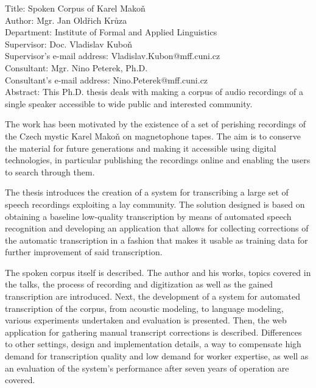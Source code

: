\noindent
Title: Spoken Corpus of Karel Makoň\\
Author: Mgr. Jan Oldřich Krůza\\
Department: Institute of Formal and Applied Linguistics\\
Supervisor: Doc. Vladislav Kuboň\\
Supervisor's e-mail address: Vladislav.Kubon@mff.cuni.cz\\
Consultant: Mgr. Nino Peterek, Ph.D.\\
Consultant's e-mail address: Nino.Peterek@mff.cuni.cz\\

\noindent Abstract:  This Ph.D. thesis deals with making a corpus of audio
recordings of a single speaker accessible to wide public and interested community.

The work has been motivated by the existence of a set of perishing recordings
of the Czech mystic Karel Makoň on magnetophone tapes. The aim is to conserve
the material for future generations and making it accessible using
digital technologies, in particular publishing the recordings online
and enabling the users to search through them.

The thesis introduces the creation of a system for transcribing a large set of
speech recordings exploiting a lay community. The solution designed is based on
obtaining a baseline low-quality transcription by means of automated speech
recognition and developing an application that allows for collecting corrections
of the automatic transcription in a fashion that makes it usable as training
data for further improvement of said transcription.

The spoken corpus itself is described. The
author and his works, topics covered in the talks, the process of recording
and digitization as well as the gained transcription are introduced.
Next, the development of a system for automated transcription of
the corpus, from acoustic modeling, to language modeling, various experiments
undertaken and evaluation is presented. Then, the web application for gathering
manual transcript corrections is described.
Differences to other settings, design and implementation details, a way to
compensate high demand for transcription quality and low demand for worker
expertise, as well as an evaluation of the system's performance after seven
years of operation are covered.

